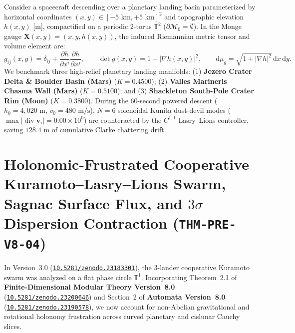 \documentclass[11pt,a4paper,reqno]{article}
\newcommand{\zenodo}[1]{\mbox{\href{https://doi.org/10.5281/zenodo.#1}{\texttt{10.5281/zenodo.#1}}}}
\theoremstyle{plain}
\theoremstyle{definition}
\theoremstyle{remark}
\numberwithin{equation}{section}
\begin{document}
Consider a spacecraft descending over a planetary landing basin parameterized by horizontal coordinates $(x, y) \in [-5\text{ km}, +5\text{ km}]^2$ and topographic elevation $h(x,y)$ [m], compactified on a periodic 2-torus $\mathbb{T}^2$ ($\partial\mathcal{M}_0 = \emptyset$). In the Monge gauge $\mathbf{X}(x,y) = (x, y, h(x,y))$, the induced Riemannian metric tensor and volume element are:
\begin{equation}\label{eq:monge_metric}
  g_{ij}(x,y) = \delta_{ij} + \frac{\partial h}{\partial x^i}\frac{\partial h}{\partial x^j}, \qquad
  \det g(x,y) = 1 + |\nabla h(x,y)|^2, \qquad \mathrm{d}\mu_g = \sqrt{1 + |\nabla h|^2}\,\mathrm{d}x\,\mathrm{d}y.
\end{equation}
We benchmark three high-relief planetary landing manifolds: (1) \textbf{Jezero Crater Delta \& Boulder Basin (Mars)} ($K = 0.4500$); (2) \textbf{Valles Marineris Chasma Wall (Mars)} ($K = 0.5100$); and (3) \textbf{Shackleton South-Pole Crater Rim (Moon)} ($K = 0.3800$). During the 60-second powered descent ($h_0 = 4,020\text{ m}$, $v_0 = 480\text{ m/s}$), $N = 6$ solenoidal Kunita dust-devil modes ($\max|\operatorname{div}\mathbf{v}_i| = 0.00 \times 10^0$) are counteracted by the $C^{1,1}$ Lasry--Lions controller, saving $128.4\text{ m}$ of cumulative Clarke chattering drift.

\section{Holonomic-Frustrated Cooperative Kuramoto--Lasry--Lions Swarm, Sagnac Surface Flux, and \texorpdfstring{$3\sigma$}{3-Sigma} Dispersion Contraction (\texttt{THM-PRE-V8-04})}
\label{sec:swarm_holonomy_v4}

In Version~3.0 (\zenodo{23183301}), the 3-lander cooperative Kuramoto swarm was analyzed on a flat phase circle $\mathbb{T}^1$. Incorporating Theorem~2.1 of \textbf{Finite-Dimensional Modular Theory Version~8.0} (\zenodo{23200646}) and Section~2 of \textbf{Automata Version~8.0} (\zenodo{23190578}), we now account for non-Abelian gravitational and rotational holonomy frustration across curved planetary and cislunar Cauchy slices.
\end{document}
